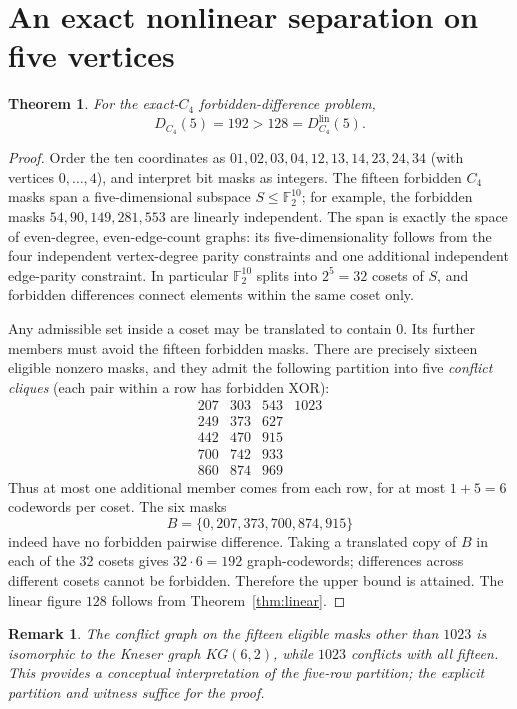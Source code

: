 \documentclass[11pt,a4paper]{article}
\newtheorem{theorem}{Theorem}
\newtheorem{remark}{Remark}
\newcommand{\F}{\mathbb{F}}
\begin{document}
\section{An exact nonlinear separation on five vertices}
\begin{theorem}\label{thm:nonlinear5}
For the exact-$C_4$ forbidden-difference problem,
\[
\boxed{D_{C_4}(5)=192>128=D_{C_4}^{\mathrm{lin}}(5).}
\]
\end{theorem}
\begin{proof}
Order the ten coordinates as
$01,02,03,04,12,13,14,23,24,34$ (with vertices $0,\ldots,4$), and interpret bit masks as integers. The fifteen forbidden $C_4$ masks span a five-dimensional subspace $S\le\F_2^{10}$; for example, the forbidden masks $54,90,149,281,553$ are linearly independent. The span is exactly the space of even-degree, even-edge-count graphs: its five-dimensionality follows from the four independent vertex-degree parity constraints and one additional independent edge-parity constraint. In particular $\F_2^{10}$ splits into $2^5=32$ cosets of $S$, and forbidden differences connect elements within the same coset only.

Any admissible set inside a coset may be translated to contain $0$. Its further members must avoid the fifteen forbidden masks. There are precisely sixteen eligible nonzero masks, and they admit the following partition into five \emph{conflict cliques} (each pair within a row has forbidden XOR):
\[
\begin{array}{llll}
207&303&543&1023\\
249&373&627&\\
442&470&915&\\
700&742&933&\\
860&874&969&
\end{array}
\]
Thus at most one additional member comes from each row, for at most $1+5=6$ codewords per coset. The six masks
\[
  B=\{0,207,373,700,874,915\}
\]
indeed have no forbidden pairwise difference. Taking a translated copy of $B$ in each of the 32 cosets gives $32\cdot6=192$ graph-codewords; differences across different cosets cannot be forbidden. Therefore the upper bound is attained. The linear figure $128$ follows from Theorem~\ref{thm:linear}.
\end{proof}

\begin{remark}
The conflict graph on the fifteen eligible masks other than $1023$ is isomorphic to the Kneser graph $KG(6,2)$, while $1023$ conflicts with all fifteen. This provides a conceptual interpretation of the five-row partition; the explicit partition and witness suffice for the proof.
\end{remark}
\end{document}
